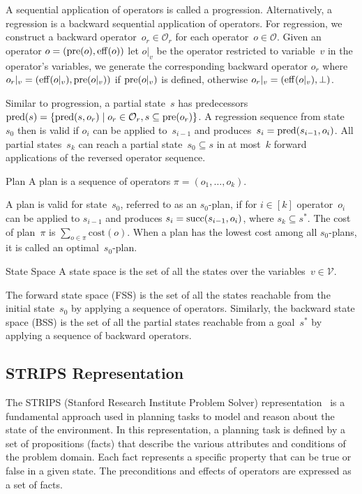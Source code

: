 A sequential application of operators is called a progression. Alternatively, a regression is a backward sequential application of operators. For regression, we construct a backward operator~$o_r \in \mathcal{O}_r$ for each operator~$o \in \mathcal{O}$. Given an operator $o=(\operatorname{pre}(o), \operatorname{eff}(o))$ let $o|_v$ be the operator restricted to variable~$v$ in the operator's variables, we generate the corresponding backward operator $o_r$ where $o_r|_v = (\operatorname{eff}(o|_v), \operatorname{pre}(o|_v))$ if $\operatorname{pre}(o|_v)$ is defined, otherwise $o_r|_v = (\operatorname{eff}(o|_v),\bot)$.

Similar to progression, a partial state~$s$ has predecessors $\operatorname{pred}(s)=\{\operatorname{pred}(s,o_r)\mid o_r\in \mathcal{O}_r, s \subseteq \operatorname{pre}(o_r)\}$. A regression sequence from state~$s_0$ then is valid if $o_i$ can be applied to~$s_{i-1}$ and produces~$s_i=\operatorname{pred}(s_{i-1},o_i)$. All partial states~$s_k$ can reach a partial state~$s_0 \subseteq s$ in at most~$k$ forward applications of the reversed operator sequence.

\begin{definition}{Plan}
    \label{def:plan}
    A plan is a sequence of operators $\pi=(o_1,\ldots,o_k)$.
\end{definition}

A plan is valid for state~$s_0$, referred to as an $s_0$-plan, if for $i\in[k]$ operator~$o_i$ can be applied to $s_{i-1}$ and produces $s_i=\operatorname{succ}(s_{i-1},o_i)$, where $s_k \subseteq s^*$. The cost of plan~$\pi$ is $\sum_{o\in\pi} \text{cost}(o)$. When a plan has the lowest cost among all $s_0$-plans, it is called an optimal~$s_0$-plan.

\begin{definition}{State Space}
    \label{def:statespace}
    A state space is the set of all the states over the variables~$v \in \mathcal{V}$.
\end{definition}

The forward state space (FSS) is the set of all the states reachable from the initial state~$s_0$ by applying a sequence of operators. Similarly, the backward state space (BSS) is the set of all the partial states reachable from a goal~$s^*$ by applying a sequence of backward operators.

\subsection{STRIPS Representation}
\label{sec:strips}

The STRIPS (Stanford Research Institute Problem Solver) representation~\cite{fikes1971strips} is a fundamental approach used in planning tasks to model and reason about the state of the environment. In this representation, a planning task is defined by a set of propositions (facts) that describe the various attributes and conditions of the problem domain. Each fact represents a specific property that can be true or false in a given state. The preconditions and effects of operators are expressed as a set of facts.

